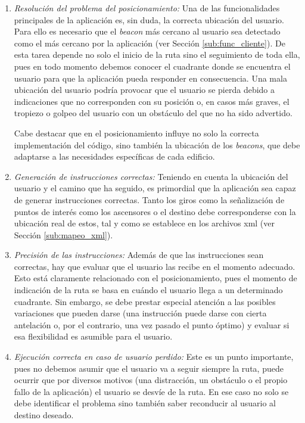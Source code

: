 \begin{enumerate}
	
	\item \textit{Resolución del problema del posicionamiento:} Una de las funcionalidades principales de la aplicación es, sin duda, la correcta ubicación del usuario. Para ello es necesario que el \textit{beacon} más cercano al usuario sea detectado como el más cercano por la aplicación (ver Sección \ref{sub:func_cliente}). De esta tarea depende no solo el inicio de la ruta sino el seguimiento de toda ella, pues en todo momento debemos conocer el cuadrante donde se encuentra el usuario para que la aplicación pueda responder en consecuencia. Una mala ubicación del usuario podría provocar que el usuario se pierda debido a indicaciones que no corresponden con su posición o, en casos más graves, el tropiezo o golpeo del usuario con un obstáculo del que no ha sido advertido.
	
	Cabe destacar que en el posicionamiento influye no solo la correcta implementación del código, sino también la ubicación de los \textit{beacons}, que debe adaptarse a las necesidades específicas de cada edificio. 
	
	\item \textit{Generación de instrucciones correctas:} Teniendo en cuenta la ubicación del usuario y el camino que ha seguido, es primordial que la aplicación sea capaz de generar instrucciones correctas. Tanto los giros como la señalización de puntos de interés como los ascensores o el destino debe corresponderse con la ubicación real de estos, tal y como se establece en los archivos xml (ver Sección \ref{sub:mapeo_xml}).
	
	\item \textit{Precisión de las instrucciones:} Además de que las instrucciones sean correctas, hay que evaluar que el usuario las recibe en el momento adecuado. Esto está claramente relacionado con el posicionamiento, pues el momento de indicación de la ruta se basa en cuándo el usuario llega a un determinado cuadrante. Sin embargo, se debe prestar especial atención a las posibles variaciones que pueden darse (una instrucción puede darse con cierta antelación o, por el contrario, una vez pasado el punto óptimo) y evaluar si esa flexibilidad es asumible para el usuario.
	
	\item \textit{Ejecución correcta en caso de usuario perdido:} Este es un punto importante, pues no debemos asumir que el usuario va a seguir siempre la ruta, puede ocurrir que por diversos motivos (una distracción, un obstáculo o el propio fallo de la aplicación) el usuario se desvíe de la ruta. En ese caso no solo se debe identificar el problema sino también saber reconducir al usuario al destino deseado. 
		
\end{enumerate}


